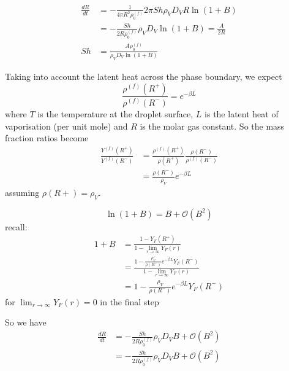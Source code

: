 \documentclass[12pt,twoside]{report}
\begin{document}
\begin{equation}
  \begin{aligned}
  \frac{dR}{dt} &=
  -\frac{1}{4\pi R^2 \rho^{(f)}_0}
  2\pi Sh \rho_V D_V R \ln{(1 + B)} \\
  &=
  -\frac{Sh}{2 R \rho^{(f)}_0}
  \rho_V D_V \ln{(1 + B)} =
  \frac{A}{2 R} \\
  Sh &= \frac{A \rho^{(f)}_0}{\rho_V D_V \ln{(1+B)}}
  \end{aligned}
\end{equation}

Taking into account the latent heat across the phase boundary, we expect
\begin{equation}
  \frac{\rho^{(f)}(R^+)}{\rho^{(f)}(R^-)} =
  e^{-\beta L}
\end{equation}
where $T$ is the temperature at the droplet surface, $L$ is the latent heat of vaporisation (per unit mole) and $R$ is the molar gas constant.
So the mass fraction ratios become
\begin{equation}
  \begin{aligned}
    \frac{Y^{(f)}(R^+)}{Y^{(f)}(R^-)} &=
    \frac{\rho^{(f)}(R^+)}{\rho(R^+)}
    \frac{\rho(R^-)}{\rho^{(f)}(R^-)} \\
    &=
    \frac{\rho(R^-)}{\rho_V}
    e^{-\beta L}
  \end{aligned}
\end{equation}
assuming $\rho(R+) = \rho_V$.

\begin{equation*}
  \ln{(1 + B)} = B + \mathcal{O}(B^2)
\end{equation*}
recall:
\begin{equation*}
  \begin{aligned}
    1 + B &=
    \frac{1 - Y_F(R^+)}{1 - \displaystyle{\lim_{r \to \infty}} Y_F(r)} \\
    &=
    \frac{1 - \frac{\rho_V}{\rho(R^-)}
      e^{-\beta L} Y_F(R^-)}{1 - \displaystyle{\lim_{r \to \infty}} Y_F(r)} \\
    &=
    1 - \frac{\rho_V}{\rho(R^-)} e^{-\beta L} Y_F(R^-)
  \end{aligned}
\end{equation*}
for $\lim_{r \to \infty} Y_F(r) = 0$ in the final step

So we have
\begin{equation*}
  \begin{aligned}
    \frac{dR}{dt} &=
    -\frac{Sh}{2 R \rho^{(f)}_0}
    \rho_V D_V B + \mathcal{O}(B^2) \\
    &=
    -\frac{Sh}{2 R \rho^{(f)}_0}
    \rho_V D_V B + \mathcal{O}(B^2)
  \end{aligned}
\end{equation*}
\end{document}
